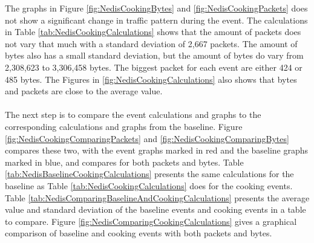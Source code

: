 The graphs in Figure \ref{fig:NedisCookingBytes} and \ref{fig:NedisCookingPackets} does not show a significant change in traffic pattern during the event. The calculations in Table \ref{tab:NedisCookingCalculations} shows that the amount of packets does not vary that much with a standard deviation of 2,667 packets. The amount of bytes also has a small standard deviation, but the amount of bytes do vary from 2,308,623 to 3,306,458 bytes. The biggest packet for each event are either 424 or 485 bytes. The Figures in \ref{fig:NedisCookingCalculations} also shows that bytes and packets are close to the average value. 
\\\\
The next step is to compare the event calculations and graphs to the corresponding calculations and graphs from the baseline. Figure \ref{fig:NedisCookingComparingPackets} and \ref{fig:NedisCookingComparingBytes} compares these two, with the event graphs marked in red and the baseline graphs marked in blue, and compares for both packets and bytes. Table \ref{tab:NedisBaselineCookingCalculations} presents the same calculations for the baseline as Table \ref{tab:NedisCookingCalculations} does for the cooking events. Table \ref{tab:NedisComparingBaselineAndCookingCalculations} presents the average value and standard deviation of the baseline events and cooking events in a table to compare. Figure \ref{fig:NedisComparingCookingCalculations} gives a graphical comparison of baseline and cooking events with both packets and bytes.  
\newpage
